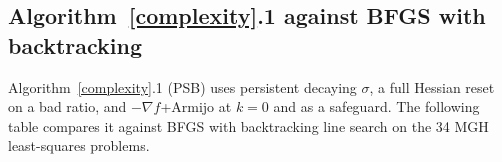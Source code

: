 \documentclass{article}
\begin{document}

\subsection{Algorithm~\ref{complexity}.1 against BFGS with backtracking}

Algorithm~\ref{complexity}.1 (PSB) uses persistent decaying $\sigma$, a full Hessian reset on a bad
ratio, and $-\nabla f$+Armijo at $k=0$ and as a safeguard. The following
table compares it against BFGS with backtracking line search on the 34
MGH least-squares problems.
\end{document}
